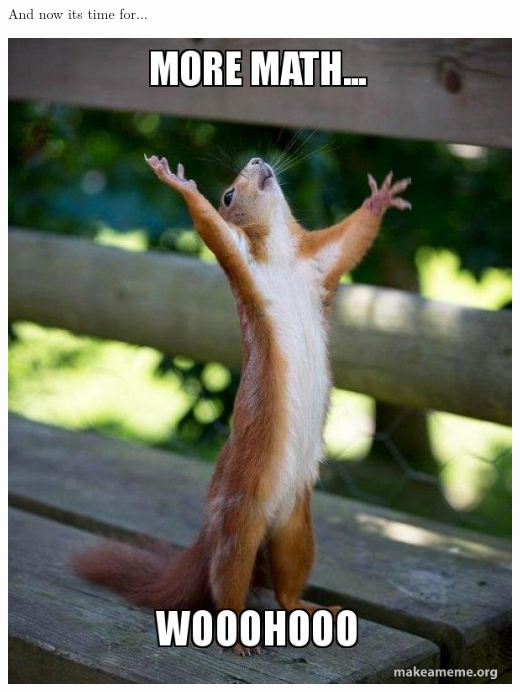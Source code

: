 \documentclass[t]{beamer}
\begin{document}
\begin{frame}{And now its time for...}
	\begin{center}
		\includegraphics[scale=0.35]{assets/more-math-wooohooo}
	\end{center}
\end{frame}
\end{document}
